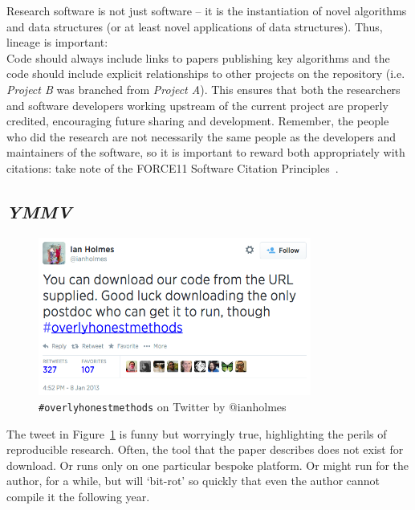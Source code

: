 \documentclass[a4paper,11pt]{article}
\begin{document}
Research software is not just software -- it is the instantiation of
novel algorithms and data structures (or at least novel applications
of data structures). Thus, lineage is important:\\

 Code should always
include links to papers publishing key algorithms and the code should
include explicit relationships to other projects on the repository
(i.e. {\emph{Project B}} was branched from {\emph{Project A}}). This
ensures that both the researchers and software developers working
upstream of the current project are properly credited, encouraging
future sharing and development. Remember, the people who did the
research are not necessarily the same people as the developers and
maintainers of the software, so it is important to reward both
appropriately with citations: take note of the FORCE11 Software
Citation Principles~\cite{smith-et-al:2016}.

\subsection{{\emph{YMMV}}}

\begin{figure}[!ht]
\centering
\includegraphics[width=0.8\textwidth]{images/overlyhonesttweet.png}
\caption{{\texttt{\#overlyhonestmethods}} on Twitter by @ianholmes}
\label{fig:overlyhonestmethod} 
\end{figure}

The tweet in Figure~\ref{fig:overlyhonestmethod} is funny but
worryingly true, highlighting the perils of reproducible
research. Often, the tool that the paper describes does not exist for
download. Or runs only on one particular bespoke platform. Or might
run for the author, for a while, but will `bit-rot' so quickly that
even the author cannot compile it the following year.\\
\end{document}
